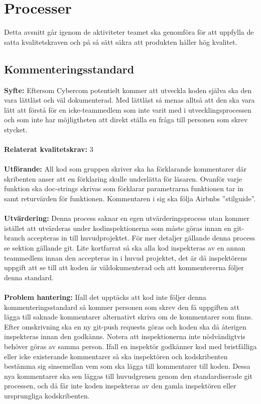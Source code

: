 \documentclass[10pt]{article}
\begin{document}
\pagebreak
\section{Processer}
	Detta avsnitt går igenom de aktiviteter teamet ska genomföra för att uppfylla de satta kvalitetskraven och på så sätt säkra att produkten håller hög kvalitet.

	\subsection{Kommenteringsstandard}
	\textbf{Syfte:}	Eftersom Cybercom potentielt kommer att utveckla koden själva ska den vara lättläst och väl dokumenterad. Med lättläst så menas alltså att den ska vara lätt att förstå för en icke-teammedlem som inte varit med i utvecklingsprocessen och som inte har möjligtheten att direkt ställa en fråga till personen som skrev stycket.
	\\\\
	\textbf{Relaterat kvalitetskrav:} 3 
	\\\\
	\textbf{Utförande:} All kod som gruppen skriver ska ha förklarande kommentarer där skribenten anser att en förklaring skulle underlätta för läsaren. Ovanför varje funktion ska doc-strings skrivas som förklarar parametrarna funktionen tar in samt returvärden för funktionen.
	Kommentaren i sig ska följa Airbnbs ''stilguide''\cite{bib-airbnb}.
	\\\\
	\textbf{Utvärdering:} Denna process saknar en egen utvärderingsprocess utan kommer istället att utvärderas under kodinspektionerna som måste göras innan en git-branch accepteras in till huvudprojektet\cite{bib-gitguide}. För mer detaljer gällande denna process se sektion gällande git. Lite kortfarrat så ska alla kod inspekteras av en annan teammedlem innan den accepteras in i huvud projektet, det är då inspektörens uppgift att se till att koden är väldokumenterad och att kommentererna följer denna standard. 
	\\\\
	\textbf{Problem hantering:} Ifall det upptäcks att kod inte följer denna kommenteringsstandard så kommer personen som skrev den få uppgiften att lägga till saknade kommentarer alternativt skriva om de kommentarer som finns. Efter omskrivning ska en ny git-push requests göras och koden ska då återigen inspekteras innan den godkänns. Notera att inspektionerna inte nödvändigtvis behöver göras av samma person.
	Ifall en inspektör godkänner kod med bristfälliga eller icke existerande kommentarer så ska inspektören och kodskribenten bestämma sig sinsemellan vem som ska lägga till kommentarer till koden. Dessa nya kommentarer ska sen läggas till huvudgrenen genom den standardiserade git processen, och då får inte koden inspekteras av den gamla inspektören eller ursprungliga kodskribenten.
\end{document}
